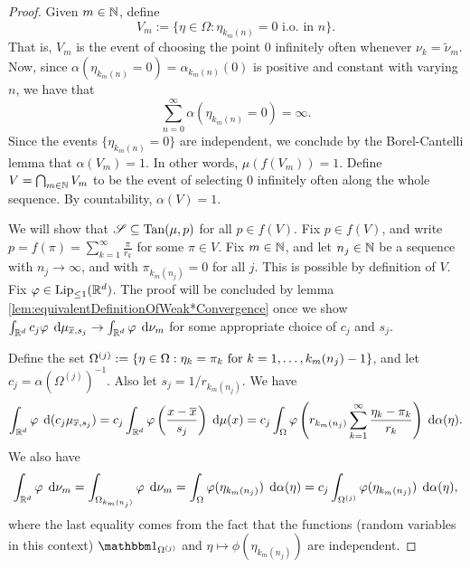\begin{proof}
    Given $m \in \mathbb{N}$, define
    \begin{equation}
        V_m := \{ \eta \in \Omega : \eta_{k_m(n)} = 0 \text{ i.o. in } n \}.
    \end{equation}
    That is, $V_m$ is the event of choosing the point $0$ infinitely often whenever $\nu_k = \widetilde{\nu}_m$.
    Now, since $\alpha(\eta_{k_m(n)} = 0) = \alpha_{k_m(n)}(0)$ is positive and constant with varying $n$, we have that 
    \begin{equation}
        \sum_{n=0}^\infty \alpha(\eta_{k_m(n)} = 0) = \infty.
    \end{equation}
    Since the events $\{ \eta_{k_m(n)} = 0 \}$ are independent, we conclude by the Borel-Cantelli lemma that $\alpha(V_m) = 1$. In other words, $\mu(f(V_m)) = 1$. Define $V = \bigcap_{m \in \mathbb{N}} V_m$ to be the event of selecting $0$ infinitely often along the whole sequence. By countability, $\alpha(V) = 1$.

    We will show that $\mathscr{S} \subseteq \operatorname{Tan}(\mu,p)$ for all $p \in f(V)$. Fix $p \in f(V)$, and write $p = f(\pi) = \sum_{k=1}^\infty \frac{\pi}{r_k}$ for some $\pi \in V$. Fix $m \in \mathbb{N}$, and let $n_j \in \mathbb{N}$ be a sequence with $n_j \rightarrow \infty$, and with $\pi_{k_m(n_j)} = 0$ for all $j$. This is possible by definition of $V$. Fix $\varphi \in \operatorname{Lip}_{\leq 1}(\mathbb{R}^d)$. The proof will be concluded by lemma \ref{lem:equivalentDefinitionOfWeak*Convergence} once we show $\int_{\mathbb{R}^d} c_j \varphi \; \operatorname{d}\!{\mu}_{\overline{x},s_j} \rightarrow \int_{\mathbb{R}^d} \varphi \; \operatorname{d}\!{\nu}_m$ for some appropriate choice of $c_j$ and $s_j$. 
    
    Define the set $\Omega^{(j)} := \left\{ { \eta \in \Omega : \eta_k = \pi_k \text{ for } k = 1,\dots,k_m(n_j)-1 } \right\}$, and let $c_j = \alpha(\Omega^{(j)})^{-1}$. Also let $s_j = 1/r_{k_m(n_j)}$. We have
    \begin{equation}
        \int_{\mathbb{R}^d} \varphi \; \operatorname{d}\!{(}c_j\mu_{\overline{x},s_j}) = c_j \int_{\mathbb{R}^d} \varphi\left( {\frac{x - \overline{x}}{s_j}} \right) \; \operatorname{d}\!{\mu}(x)
                                                            = c_j \int_{\Omega} \varphi\left( {r_{k_m(n_j)} \sum_{k=1}^\infty \frac{\eta_k - \pi_k}{r_k}} \right) \; \operatorname{d}\!{\alpha}(\eta).
    \end{equation}
    We also have 
    \begin{equation}
        \int_{\mathbb{R}^d} \varphi \; \operatorname{d}\!{\nu}_m = \int_{\Omega_{k_m(n_j)}} \varphi \; \operatorname{d}\!{\nu}_m = \int_\Omega \varphi(\eta_{k_m(n_j)}) \; \operatorname{d}\!{\alpha}(\eta) 
        = c_j \int_{\Omega^{(j)}} \varphi(\eta_{k_m(n_j)}) \; \operatorname{d}\!{\alpha}(\eta),
    \end{equation}
    where the last equality comes from the fact that the functions (random variables in this context) $\bbone_{\Omega^{(j)}}$ and $\eta \mapsto \phi(\eta_{k_m(n_j)})$ are independent.


\end{proof}
